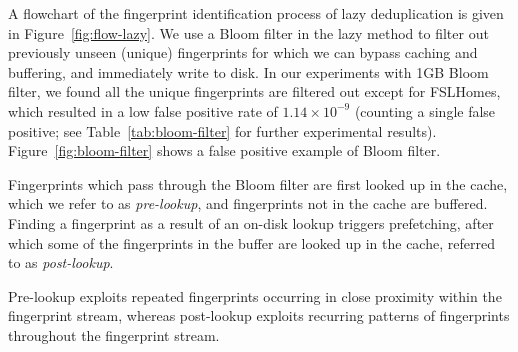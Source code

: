 \documentclass[prodmode,acmtecs]{acmsmall}
\begin{document}
A flowchart of the fingerprint identification process of lazy deduplication is given in Figure~\ref{fig:flow-lazy}.  We use a Bloom filter in the lazy method to filter out previously unseen (unique) fingerprints for which we can bypass caching and buffering, and immediately write to disk. In our experiments with 1GB Bloom filter, we found all the unique fingerprints are filtered out except for FSLHomes, which resulted in a low false positive rate of $1.14\times 10^{-9}$ (counting a single false positive; see Table~\ref{tab:bloom-filter} for further experimental results). Figure~\ref{fig:bloom-filter} shows a false positive example of Bloom filter.

Fingerprints which pass through the Bloom filter are first looked up in the cache, which we refer to as \emph{pre-lookup}, and fingerprints not in the cache are buffered.  Finding a fingerprint as a result of an on-disk lookup triggers prefetching, after which some of the fingerprints in the buffer are looked up in the cache, referred to as \emph{post-lookup}.

Pre-lookup exploits repeated fingerprints occurring in close proximity within the fingerprint stream, whereas post-lookup exploits recurring patterns of fingerprints throughout the fingerprint stream.
\end{document}
